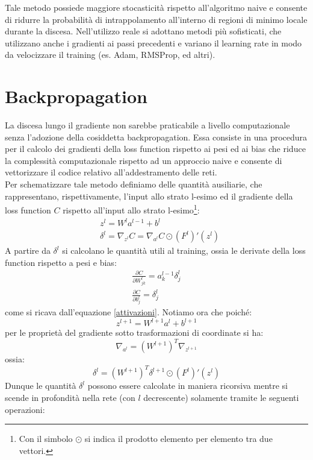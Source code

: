 \documentclass[Lau, noexaminfo, oneside]{sapthesis} %
\begin{document}
Tale metodo possiede maggiore stocasticità rispetto all'algoritmo naive e consente di ridurre la probabilità di intrappolamento all'interno di regioni di minimo locale durante la discesa.
Nell'utilizzo reale si adottano metodi più sofisticati, che utilizzano anche i gradienti ai passi precedenti e variano il learning rate in modo da velocizzare il training (es. Adam, RMSProp, ed altri).
\section{Backpropagation} 
La discesa lungo il gradiente non sarebbe praticabile a livello computazionale senza l'adozione della cosiddetta backpropagation. Essa consiste in una procedura per il calcolo dei gradienti della loss function rispetto ai pesi ed ai bias che riduce la complessità computazionale rispetto ad un approccio naive e consente di vettorizzare il codice relativo all'addestramento delle reti.\\
Per schematizzare tale metodo definiamo delle quantità ausiliarie, che rappresentano, rispettivamente, l'input allo strato l-esimo ed il gradiente della loss function $C$ rispetto all'input allo strato l-esimo\footnote{Con il simbolo $\odot$ si indica il prodotto elemento per elemento tra due vettori.}:
\begin{align}
&z^l = W^l a^{l-1} + b^l \\
&\delta^l = \nabla_{z^l} C = \nabla_{a^l} C \odot (F^l)'(z^l)
\end{align}
A partire da $\delta^l$ si calcolano le quantità utili al training, ossia le derivate della loss function rispetto a pesi e bias:
\begin{align}
\frac{\partial C}{\partial W_{jk}^l} = a_k^{l-1} \delta_j^l\\
\frac{\partial C}{\partial b^l_j} = \delta_j^l
\end{align}
come si ricava dall'equazione \eqref{attivazioni}.
Notiamo ora che poiché:
\begin{equation}
z^{l+1} = W^{l+1} a^l+b^{l+1}
\end{equation}
per le proprietà del gradiente sotto trasformazioni di coordinate si ha:
\begin{equation}
\nabla_{a^l} = (W^{l+1})^T \nabla_{z^{l+1}} 
\end{equation}
ossia:
\begin{equation}
\delta^l =(W^{l+1})^T \delta^{l+1} \odot (F^l)'(z^l)
\end{equation}
Dunque le quantità $\delta^l$ possono essere calcolate in maniera ricorsiva mentre si scende in profondità nella rete (con $l$ decrescente) solamente tramite le seguenti operazioni:
\end{document}

